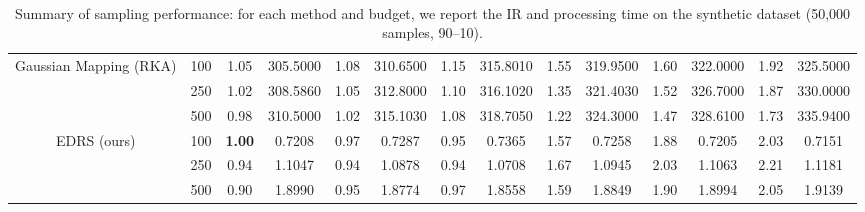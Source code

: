 \documentclass[preprint,12pt]{elsarticle}
\begin{document}
\begin{table}[!t]
{\begin{tabular}{cc|cccccccccccc}
 \multirow{3}{*}{Gaussian Mapping (RKA)} &  100    &  1.05          &  305.5000                  &  1.08          &  310.6500                  &  1.15          &  315.8010                  &  1.55          &  319.9500                  &  1.60          &  322.0000                  &  1.92          &  325.5000         \\
                                       &  250    &  1.02          &  308.5860                  &  1.05          &  312.8000                  &  1.10          &  316.1020                  &  1.35          &  321.4030                  &  1.52          &  326.7000                  &  1.87          &  330.0000         \\
                                       &  500    &  0.98          &  310.5000                  &  1.02          &  315.1030                  &  1.08          &  318.7050                  &  1.22          &  324.3000                  &  1.47          &  328.6100                  &  1.73          &  335.9400         \\ \hline

\multirow{3}{*}{EDRS (ours)}           & 100    & \textbf{1.00}          & 0.7208                    & 0.97          & 0.7287                    & 0.95          & 0.7365                    & 1.57          & 0.7258                    & 1.88          & 0.7205                    & 2.03          & 0.7151          \\
                                       & 250    & 0.94          & 1.1047                    & 0.94          & 1.0878                    & 0.94          & 1.0708                    & 1.67          & 1.0945                    & 2.03          & 1.1063                    & 2.21          & 1.1181          \\
                                       & 500    & 0.90          & 1.8990                    & 0.95          & 1.8774                    & 0.97          & 1.8558                    & 1.59          & 1.8849                    & 1.90          & 1.8994                    & 2.05          & 1.9139          \\ \hline
\end{tabular}
}
\caption{\\ Summary of sampling performance: for each method and budget, we report the IR and processing time on the synthetic dataset (50,000 samples, 90–10).}
\label{tab:methods_dataset_synthetic_2}
\end{table}
\end{document}
